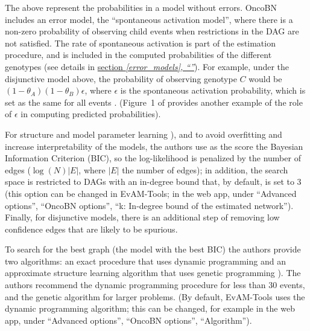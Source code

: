 \documentclass[a4paper,11pt]{article}
\newcommand*{\qrefS}[1]{\hyperref[{#1}]{section \textit{\ref*{#1},
      ``\nameref*{#1}''}}}
\begin{document}
The above represent the probabilities in a model without errors. OncoBN includes an error model, the ``spontaneous activation model'', where there is a non-zero probability of observing child events when restrictions in the DAG are not satisfied. The rate of spontaneous activation is part of the estimation procedure, and is included in the computed probabilities of the different genotypes  (see details in \qrefS{error_models}). For example, under the disjunctive model above, the probability of observing genotype $C$ would be $(1 - \theta_A) (1 - \theta_B) \epsilon$, where $\epsilon$ is the spontaneous activation probability, which is set as the same for all events  \citep[p.~5]{nicol2021oncogenetic}. (Figure~1 of \citealp{nicol2021oncogenetic} provides another example of the role of $\epsilon$ in computing predicted probabilities).



For structure and model parameter learning \citep[p.~5]{nicol2021oncogenetic}), and to avoid overfitting and increase interpretability of the models,
the authors use as the score the Bayesian Information Criterion (BIC), so the log-likelihood is penalized by the number of edges ($\log(N) |E|$, where $|E|$ the number of edges); in addition, the search space is restricted to DAGs with an in-degree bound that, by default, is set to 3 (this option can be changed in EvAM-Tools; in the web app, under ``Advanced options'', ``OncoBN options'', ``k: In-degree bound of the estimated network''). Finally, for disjunctive models, there is an additional step of removing low confidence edges that are likely to be spurious.

To search for the best graph (the model with the best BIC) the authors provide two algorithms: an exact procedure that uses dynamic programming and an approximate structure learning algorithm that uses genetic programming \citep[p.~5]{nicol2021oncogenetic}). The authors recommend the dynamic programming procedure for less than 30 events, and the genetic algorithm for larger problems. (By default, EvAM-Tools uses the dynamic programming algorithm; this can be changed, for example in the web app, under  ``Advanced options'', ``OncoBN options'', ``Algorithm'').


\end{document}
